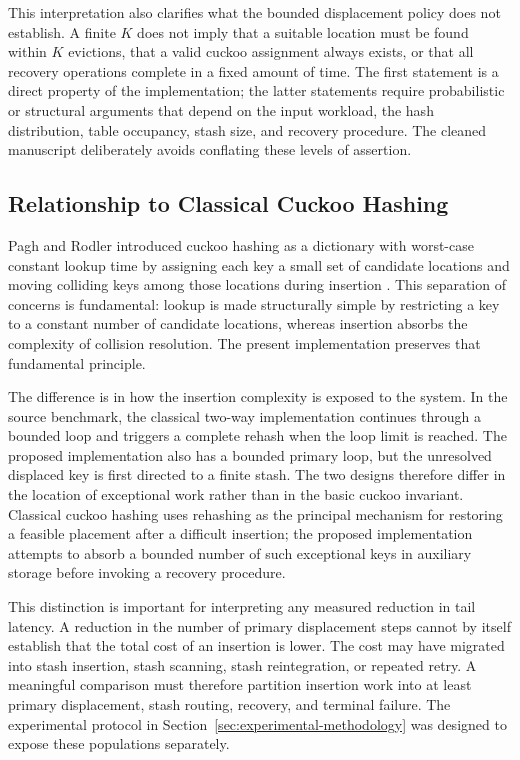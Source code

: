 \documentclass[conference]{IEEEtran}
\begin{document}
This interpretation also clarifies what the bounded displacement policy does
not establish. A finite $K$ does not imply that a suitable location must be
found within $K$ evictions, that a valid cuckoo assignment always exists, or
that all recovery operations complete in a fixed amount of time. The first
statement is a direct property of the implementation; the latter statements
require probabilistic or structural arguments that depend on the input
workload, the hash distribution, table occupancy, stash size, and recovery
procedure. The cleaned manuscript deliberately avoids conflating these
levels of assertion.

\subsection{Relationship to Classical Cuckoo Hashing}
\label{subsec:discussion_classical}

Pagh and Rodler introduced cuckoo hashing as a dictionary with worst-case
constant lookup time by assigning each key a small set of candidate locations
and moving colliding keys among those locations during insertion
\cite{pagh2004cuckoo}. This separation of concerns is fundamental: lookup is
made structurally simple by restricting a key to a constant number of
candidate locations, whereas insertion absorbs the complexity of collision
resolution. The present implementation preserves that fundamental principle.

The difference is in how the insertion complexity is exposed to the system.
In the source benchmark, the classical two-way implementation continues
through a bounded loop and triggers a complete rehash when the loop limit is
reached. The proposed implementation also has a bounded primary loop, but the
unresolved displaced key is first directed to a finite stash. The two designs
therefore differ in the location of exceptional work rather than in the basic
cuckoo invariant. Classical cuckoo hashing uses rehashing as the principal
mechanism for restoring a feasible placement after a difficult insertion;
the proposed implementation attempts to absorb a bounded number of such
exceptional keys in auxiliary storage before invoking a recovery procedure.

This distinction is important for interpreting any measured reduction in tail
latency. A reduction in the number of primary displacement steps cannot by
itself establish that the total cost of an insertion is lower. The cost may
have migrated into stash insertion, stash scanning, stash reintegration, or
repeated retry. A meaningful comparison must therefore partition insertion
work into at least primary displacement, stash routing, recovery, and terminal
failure. The experimental protocol in Section~\ref{sec:experimental-methodology} was
designed to expose these populations separately.
\end{document}

